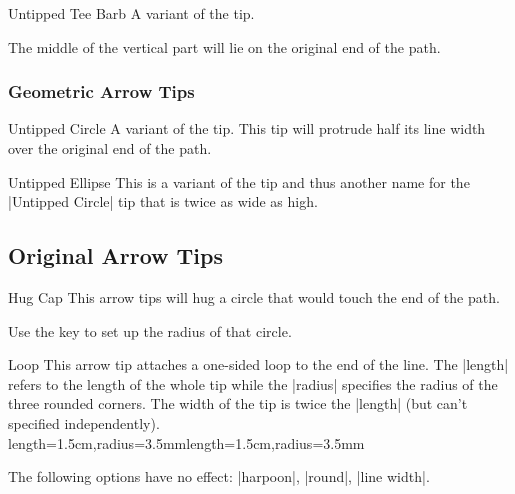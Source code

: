 \begin{multicols}{2}
\begin{arrowtipsimple}{Untipped Tee Barb}
    A variant of the  tip.
    
    The middle of the vertical part will lie on the original end of the path.
\end{arrowtipsimple}

\subsubsection{Geometric Arrow Tips}
\begin{arrowtipsimple}{Untipped Circle}
    A variant of the  tip.
    This tip will protrude half its line width over the original end of the path.
\end{arrowtipsimple}

\begin{arrowtipsimple}{Untipped Ellipse}
    This is a variant of the  tip
    and thus another name for the |Untipped Circle| tip
    that is twice as wide as high.
\end{arrowtipsimple}

\subsection{Original Arrow Tips}
\begin{arrowtipsimple}{Hug Cap}
This arrow tips will hug a circle that would touch the end of the path.

Use the  key to set up the radius of that circle.

\begin{codeexample}[preamble=\usepgflibrary{ext.arrows}]
\end{codeexample}
\end{arrowtipsimple}

\begin{arrowtip}{Loop}{
  This arrow tip attaches a one-sided loop to the end of the line.
  The |length| refers to the length of the whole tip while the |radius|
  specifies the radius of the three rounded corners.
  The width of the tip is twice the |length| (but can't specified independently).
}{length=1.5cm,radius=3.5mm}{length=1.5cm,radius=3.5mm}
    \begin{arrowexamples}
        \arrowexample[]
        \arrowexampledup[sep]
        \arrowexampledupdot[sep]
        \arrowexample[open]
        \arrowexample[length=5pt,radius=0pt]
        \arrowexample[reversed]
        \arrowexample[slant=.3]
        \arrowexample[red]
    \end{arrowexamples}
    The following options have no effect: |harpoon|, |round|, |line width|.


\end{arrowtip}
\end{multicols}
